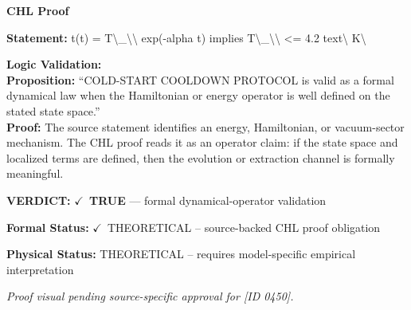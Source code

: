\vspace{0.45em}
\noindent\textbf{CHL Proof}\par
\textbf{Statement:} t(t) = T\textbackslash{}\_\textbackslash{}\textbackslash{} exp(-alpha t) implies T\textbackslash{}\_\textbackslash{}\textbackslash{} <= 4.2 text\textbackslash{} K\textbackslash{}

\textbf{Logic Validation:}\\
\textbf{Proposition:} ``COLD-START COOLDOWN PROTOCOL is valid as a formal dynamical law when the Hamiltonian or
energy operator is well defined on the stated state space.''\\
\textbf{Proof:} The source statement identifies an energy, Hamiltonian, or vacuum-sector mechanism. The
CHL proof reads it as an operator claim: if the state space and localized terms are
defined, then the evolution or extraction channel is formally meaningful.

\textbf{VERDICT:} \ensuremath{\checkmark}\ \textbf{TRUE} --- formal dynamical-operator validation

\textbf{Formal Status:} \ensuremath{\checkmark}\ THEORETICAL -- source-backed CHL proof obligation

\textbf{Physical Status:} THEORETICAL -- requires model-specific empirical interpretation
\par\vspace{0.45em}
\par
\vfill
\begingroup\footnotesize\itshape
Proof visual pending source-specific approval for [ID 0450].
\par\endgroup
\vfill
\endgroup
\endgroup
